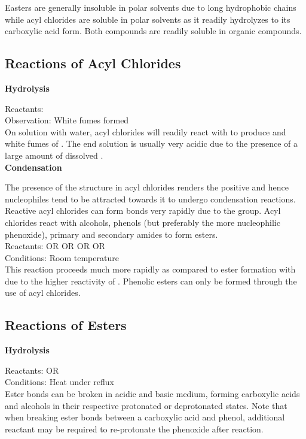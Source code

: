\documentclass[../main]{subfiles}
\begin{document}
	Easters are generally insoluble in polar solvents due to long hydrophobic chains while acyl chlorides are soluble in polar solvents as it readily hydrolyzes to its carboxylic acid form. Both compounds are readily soluble in organic compounds.

	\subsection{Reactions of Acyl Chlorides}

	\noindent \textbf{Hydrolysis}

	Reactants:  \\
	Observation: White fumes formed  \\

	On solution with water, acyl chlorides will readily react with  to produce  and white fumes of . The end solution is usually very acidic due to the presence of a large amount of dissolved . \\

	\noindent \textbf{Condensation}

	The presence of the  structure in acyl chlorides renders the  positive and hence nucleophiles tend to be attracted towards it to undergo condensation reactions. \\

	Reactive acyl chlorides can form  bonds very rapidly due to the  group. Acyl chlorides react with alcohols, phenols (but preferably the more nucleophilic phenoxide), primary and secondary amides to form esters. \\

	Reactants:  OR  OR  OR  OR  \\
	Conditions: Room temperature \\

	This reaction proceeds much more rapidly as compared to ester formation with  due to the higher reactivity of . Phenolic esters can only be formed through the use of acyl chlorides.

	\subsection{Reactions of Esters}

	\noindent \textbf{Hydrolysis}

	Reactants:  OR  \\
	Conditions: Heat under reflux \\

	Ester bonds can be broken in acidic and basic medium, forming carboxylic acids and alcohols in their respective protonated or deprotonated states. Note that when breaking ester bonds between a carboxylic acid and phenol, additional reactant may be required to re-protonate the phenoxide after reaction. \\
	
\end{document}
